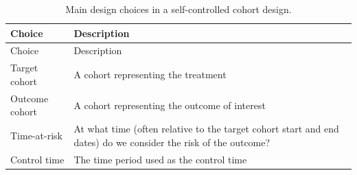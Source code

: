\documentclass[11pt]{book}
\begin{document}
\begin{longtable}[]{@{}ll@{}}
\caption{\label{tab:sccChoices} Main design choices in a self-controlled
cohort design.}\tabularnewline
\toprule
\begin{minipage}[b]{0.23\columnwidth}\raggedright\strut
Choice\strut
\end{minipage} & \begin{minipage}[b]{0.71\columnwidth}\raggedright\strut
Description\strut
\end{minipage}\tabularnewline
\midrule
\endfirsthead
\toprule
\begin{minipage}[b]{0.23\columnwidth}\raggedright\strut
Choice\strut
\end{minipage} & \begin{minipage}[b]{0.71\columnwidth}\raggedright\strut
Description\strut
\end{minipage}\tabularnewline
\midrule
\endhead
\begin{minipage}[t]{0.23\columnwidth}\raggedright\strut
Target cohort\strut
\end{minipage} & \begin{minipage}[t]{0.71\columnwidth}\raggedright\strut
A cohort representing the treatment\strut
\end{minipage}\tabularnewline
\begin{minipage}[t]{0.23\columnwidth}\raggedright\strut
Outcome cohort\strut
\end{minipage} & \begin{minipage}[t]{0.71\columnwidth}\raggedright\strut
A cohort representing the outcome of interest\strut
\end{minipage}\tabularnewline
\begin{minipage}[t]{0.23\columnwidth}\raggedright\strut
Time-at-risk\strut
\end{minipage} & \begin{minipage}[t]{0.71\columnwidth}\raggedright\strut
At what time (often relative to the target cohort start and end dates)
do we consider the risk of the outcome?\strut
\end{minipage}\tabularnewline
\begin{minipage}[t]{0.23\columnwidth}\raggedright\strut
Control time\strut
\end{minipage} & \begin{minipage}[t]{0.71\columnwidth}\raggedright\strut
The time period used as the control time\strut
\end{minipage}\tabularnewline
\bottomrule
\end{longtable}
\end{document}
